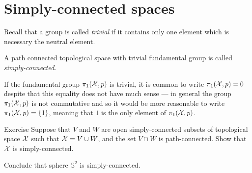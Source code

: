 \section{Simply-connected spaces}

Recall that a group is called \emph{trivial} if it contains only one element which is necessary the neutral element.

A path connected topological space with trivial fundamental group is called \emph{simply-connected}.

If the fundamental group $\pi_1(\mathcal{X},p)$ is trivial, it is common to write $\pi_1(\mathcal{X},p)=0$ despite that this equality does not have much sense --- in general the group $\pi_1(\mathcal{X},p)$ is not commutative and so it would be more reasonable to write $\pi_1(\c{X},p)\z=\{1\}$, meaning that $1$ is the only element of $\pi_1(\mathcal{X},p)$.


\begin{thm}{Exercise}\label{ex:sc-VuW}
Suppose that $V$ and $W$ are open simply-connected subsets of topological space $\mathcal{X}$ such that 
$\mathcal{X}=V\cup W$, and the set $V\cap W$ is path-connected.
Show that $\mathcal{X}$ is simply-connected.

Conclude that sphere $\mathbb{S}^2$ is simply-connected.
\end{thm}
